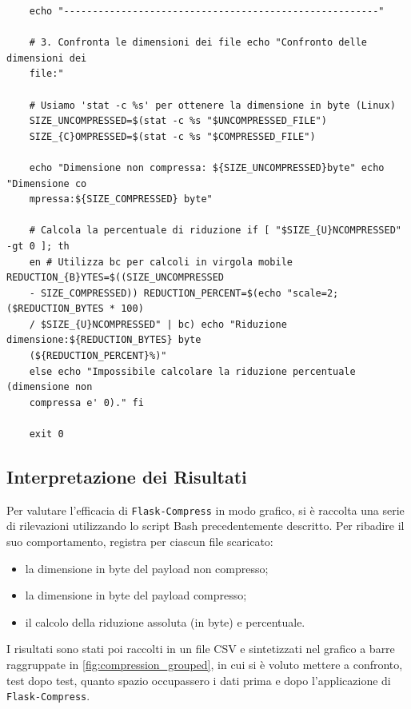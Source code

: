 \begin{longlisting}
\begin{verbatim}
    echo "-------------------------------------------------------"

    # 3. Confronta le dimensioni dei file echo "Confronto delle dimensioni dei
    file:"

    # Usiamo 'stat -c %s' per ottenere la dimensione in byte (Linux)
    SIZE_UNCOMPRESSED=$(stat -c %s "$UNCOMPRESSED_FILE")
    SIZE_{C}OMPRESSED=$(stat -c %s "$COMPRESSED_FILE")

    echo "Dimensione non compressa: ${SIZE_UNCOMPRESSED}byte" echo "Dimensione co
    mpressa:${SIZE_COMPRESSED} byte"

    # Calcola la percentuale di riduzione if [ "$SIZE_{U}NCOMPRESSED" -gt 0 ]; th
    en # Utilizza bc per calcoli in virgola mobile REDUCTION_{B}YTES=$((SIZE_UNCOMPRESSED
    - SIZE_COMPRESSED)) REDUCTION_PERCENT=$(echo "scale=2; ($REDUCTION_BYTES * 100)
    / $SIZE_{U}NCOMPRESSED" | bc) echo "Riduzione dimensione:${REDUCTION_BYTES} byte
    (${REDUCTION_PERCENT}%)"
    else echo "Impossibile calcolare la riduzione percentuale (dimensione non
    compressa e' 0)." fi

    exit 0
  \end{verbatim}
\end{longlisting}

\subsection{Interpretazione dei Risultati}

Per valutare l'efficacia di \texttt{Flask-Compress} in modo grafico, si è
raccolta una serie di rilevazioni utilizzando lo script Bash precedentemente
descritto. Per ribadire il suo comportamento, registra per ciascun file
scaricato:

\begin{itemize}
  \item la dimensione in byte del payload non compresso;

  \item la dimensione in byte del payload compresso;

  \item il calcolo della riduzione assoluta (in byte) e percentuale.
\end{itemize}

\noindent
I risultati sono stati poi raccolti in un file CSV e sintetizzati nel grafico a barre
raggruppate in \autoref{fig:compression_grouped}, in cui si è voluto mettere a
confronto, test dopo test, quanto spazio occupassero i dati prima e dopo l'applicazione
di \texttt{Flask-Compress}.

